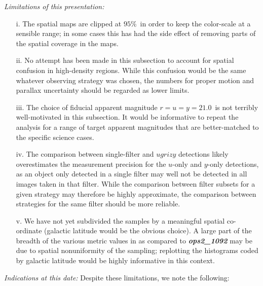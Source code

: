 {\it Limitations of this presentation:} 
\begin{itemize}
  \item[i.] The spatial maps are clipped at $95\%$~in order to keep
    the color-scale at a sensible range; in some cases this has had
    the side effect of removing parts of the spatial coverage in the
     maps. 

  \item[ii.] No attempt has been made in this subsection to account
    for spatial confusion in high-density regions. While this
    confusion would be the same whatever observing strategy was
    chosen, the numbers for proper motion and parallax uncertainty
    should be regarded as lower limits.

    \item[iii.] The choice of fiducial apparent magnitude $r = u = y =
      21.0$~is not terribly well-motivated in this subsection. It
      would be informative to repeat the analysis for a range of
      target apparent magnitudes that are better-matched to the
      specific science cases.

      \item[iv.] The comparison between single-filter and $ugrizy$
        detections likely overestimates the measurement precision for
        the $u$-only and $y$-only detections, as an object only
        detected in a single filter may well not be detected in all
        images taken in that filter. While the comparison between
        filter subsets for a given strategy may therefore be highly
        approximate, the comparison between strategies for the same
        filter should be more reliable.

  \item[v.] We have not yet subdivided the samples by a meaningful
    spatial co-ordinate (galactic latitude would be the obvious
    choice). A large part of the breadth of the various metric values in
     as compared to {\it \bf ops2\_1092} may be
      due to spatial nonuniformity of the sampling; replotting the
      histograms coded by galactic latitude would be highly informative in this context.

\end{itemize}

{\it Indications at this date:} Despite these limitations, we note the following: 

